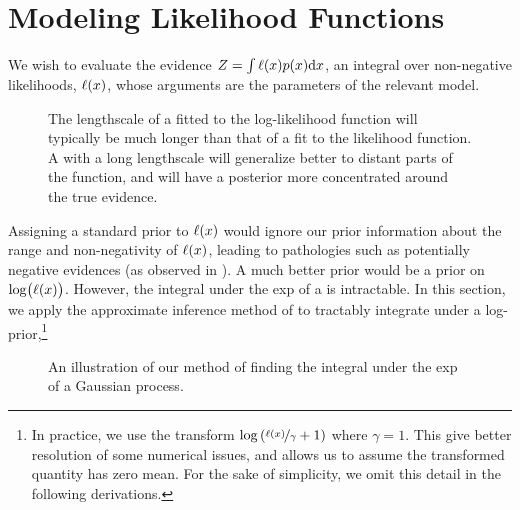 \documentclass{article}
\begin{document}
\section{Modeling Likelihood Functions}\label{sec:model_lik}

We wish to evaluate the evidence $Z = \int \lfn(\lfv) p(\lfv) \ud\lfv$, an integral over non-negative likelihoods, $\lfn(\lfv)$, whose arguments are the parameters of the relevant model.


 \begin{figure}
 \centering
 \caption{The lengthscale of a \gpb fitted to the log-likelihood function will typically be much longer than that of a \gpb fit to the likelihood function.  A \gpb with a long lengthscale will generalize better to distant parts of the function, and will have a posterior more concentrated around the true evidence. }
 \label{fig:log_is_better}
 \end{figure}

Assigning a standard \gpb prior to $\lfn(\lfv)$ would ignore our prior information about the range and non-negativity of $\lfn(\lfv)$, leading to pathologies such as potentially negative evidences (as observed in \citet{BZMonteCarlo}).  A much better prior would be a \gpb prior on $\log\bigl(\lfn(x)\bigr)$.  However, the integral under the exp of a \gpb is intractable.  In this section, we apply the approximate inference method of \citep{BQR} to tractably integrate under a log-\gpb prior,\footnote{In practice, we use the transform 
$\log\left(\nicefrac{\lfn(\lfv)}{\gamma} + 1\right)$
where $\gamma = 1$.  This give better resolution of some numerical issues, and allows us to assume the transformed quantity has zero mean. For the sake of simplicity, we omit this detail in the following derivations.}

\begin{figure}
\centering
{}
\caption{An illustration of our method of finding the integral under the exp of a Gaussian process.}
\label{fig:integrate_hypers}
\end{figure}

\end{document}

